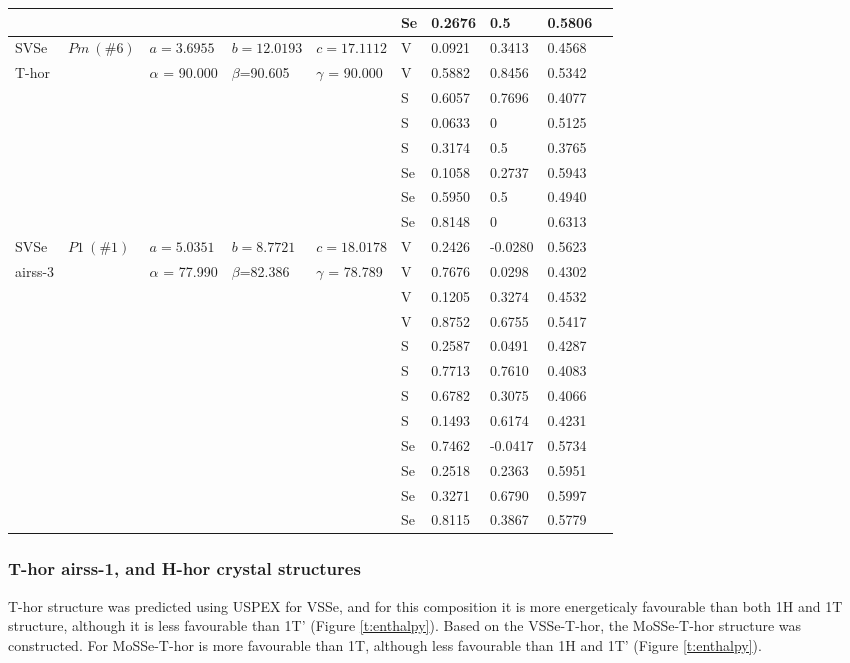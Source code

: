 \documentclass[a4paperm]{article}
\begin{document}
\begin{table}[H]
\begin{tabular}{l*{9}{l}}
		&&&&& Se	&	0.2676	&	0.5	&	0.5806	\\
		\hline
		SVSe & $Pm\ (\#6)$  &	$a=3.6955$ & $b=12.0193$ & $c=17.1112$  & V	&	0.0921	&	0.3413	&	0.4568	\\
		T-hor&&$\alpha$ = 90.000& $\beta$=90.605& $\gamma$ = 90.000& V	&	0.5882	&	0.8456	&	0.5342	\\
		&&&&&	S	&	0.6057	&	0.7696	&	0.4077	\\
		&&&&&	S	&	0.0633	&	0		&	0.5125	\\
		&&&&&	S	&	0.3174	&	0.5		&	0.3765	\\
		&&&&&	Se	&	0.1058	&	0.2737	&	0.5943	\\
		&&&&&	Se	&	0.5950	&	0.5		&	0.4940	\\
		&&&&&	Se	&	0.8148	&	0		&	0.6313	\\
		\hline
		SVSe & $P1\ (\#1)$  &	$a=5.0351$ & $b=8.7721$ & $c=18.0178$  & V	&	0.2426	&	-0.0280	&	0.5623	\\
		airss-3&&$\alpha$ = 77.990& $\beta$=82.386& $\gamma$ = 78.789  & V	&	0.7676	&	0.0298	&	0.4302	\\		
		&&&&&	V	&	0.1205	&	0.3274	&	0.4532	\\
		&&&&&	V	&	0.8752	&	0.6755	&	0.5417	\\
		&&&&&	S	&	0.2587	&	0.0491	&	0.4287	\\
		&&&&&	S	&	0.7713	&	0.7610	&	0.4083	\\
		&&&&&	S	&	0.6782	&	0.3075	&	0.4066	\\
		&&&&&	S	&	0.1493	&	0.6174	&	0.4231	\\
		&&&&&	Se	&	0.7462	&	-0.0417	&	0.5734	\\
		&&&&&	Se	&	0.2518	&	0.2363	&	0.5951	\\
		&&&&&	Se	&	0.3271	&	0.6790	&	0.5997	\\
		&&&&&	Se	&	0.8115	&	0.3867	&	0.5779	\\
		\hline
	\end{tabular}
\end{table}


\subsubsection{T-hor airss-1, and H-hor crystal structures}
T-hor structure was predicted using USPEX for VSSe, and for this composition it is more  energeticaly favourable than both 1H and 1T structure, although it is less favourable than 1T' (Figure \ref{t:enthalpy}).
Based on the VSSe-T-hor, the MoSSe-T-hor structure was constructed.
For MoSSe-T-hor is more favourable than 1T, although less favourable than 1H and 1T' (Figure \ref{t:enthalpy}).
\end{document}
